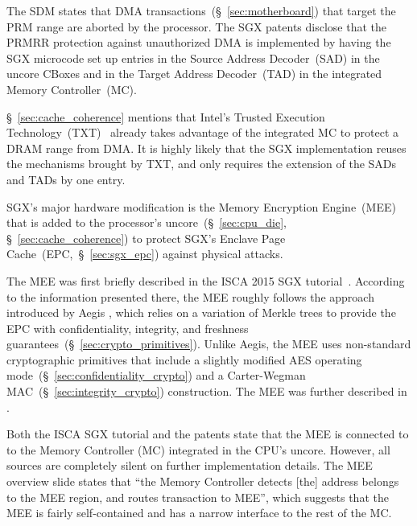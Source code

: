 \label{sec:sgx_uncore_modifications}


The SDM states that DMA transactions~(\S~\ref{sec:motherboard}) that target the
PRM range are aborted by the processor. The SGX patents disclose that the PRMRR
protection against unauthorized DMA is implemented by having the SGX microcode
set up entries in the Source Address Decoder~(SAD) in the uncore CBoxes and in
the Target Address Decoder~(TAD) in the integrated Memory Controller~(MC).

\S~\ref{sec:cache_coherence} mentions that Intel's Trusted Execution
Technology~(TXT)~\cite{grawrock2009txt} already takes advantage of the
integrated MC to protect a DRAM range from DMA. It is highly likely that the
SGX implementation reuses the mechanisms brought by TXT, and only requires the
extension of the SADs and TADs by one entry.

SGX's major hardware modification is the Memory Encryption Engine~(MEE) that is
added to the processor's uncore~(\S~\ref{sec:cpu_die},
\S~\ref{sec:cache_coherence}) to protect SGX's Enclave Page
Cache~(EPC,~\S~\ref{sec:sgx_epc}) against physical attacks.


The MEE was first briefly described in the ISCA 2015 SGX
tutorial~\cite{intel2015iscasgx}. According to the information presented there,
the MEE roughly follows the approach introduced by Aegis \cite{suh2003aegis}
\cite{aegis_impl}, which relies on a variation of Merkle trees to provide the
EPC with confidentiality, integrity, and freshness
guarantees~(\S~\ref{sec:crypto_primitives}). Unlike Aegis, the MEE uses
non-standard cryptographic primitives that include a slightly modified AES
operating mode~(\S~\ref{sec:confidentiality_crypto}) and a
Carter-Wegman~\cite{carter1977mac, wegman1981mac}
MAC~(\S~\ref{sec:integrity_crypto}) construction. The MEE was further described
in \cite{gueron2016sgxmee}.


Both the ISCA SGX tutorial and the patents state that the MEE is connected to
to the Memory Controller (MC) integrated in the CPU's uncore. However, all
sources are completely silent on further implementation details. The
MEE overview slide states that ``the Memory Controller detects [the] address
belongs to the MEE region, and routes transaction to MEE'', which suggests that
the MEE is fairly self-contained and has a narrow interface to the rest of the
MC.

